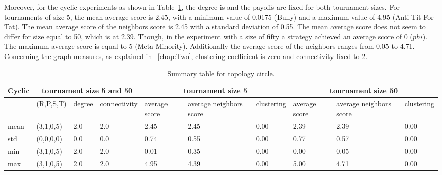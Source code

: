 Moreover, for the cyclic experiments as shown in Table~\ref{sum-cicle}, the degree is
and the payoffs are fixed for both tournament sizes. For tournaments of size 5,
the mean average score is 2.45, with a minimum value of 0.0175 (Bully) and a maximum
value of 4.95 (Anti Tit For Tat). The mean average score of the neighbors score
is 2.45 with a standard deviation of 0.55.
The mean average score does not seem to differ for size equal to 50, which is at
2.39. Though, in the experiment with a size of fifty a strategy
achieved an average score of 0 ($phi$). The maximum average score is equal to
5 (Meta Minority). Additionally the average score of the neighbors ranges
from 0.05 to 4.71. Concerning the graph measures, as explained in ~\ref{chap:Two},
clustering coefficient is zero and connectivity fixed to 2.
\begin{table}[!hbtp]
	\centering
	\begin{adjustbox}{width=1\textwidth}
		\small
		\begin{tabular}{@{}|l|l|l|l|l|l|l|l|l|l|@{}}
			\toprule
			Cyclic & \multicolumn{3}{c|}{tournament size 5 and 50} & \multicolumn{3}{c|}{tournament size 5} & \multicolumn{3}{c|}{tournament size 50}                             \\\midrule

			     & (R,P,S,T) & degree & connectivity & average score & average neighbors score & clustering & average score & average neighbors score & clustering \\\midrule
			mean & (3,1,0,5) & 2.0    & 2.0          & 2.45          & 2.45                    & 0.00       & 2.39          & 2.39                    & 0.00       \\\midrule
			std  & (0,0,0,0) & 0.0    & 0.0          & 0.74          & 0.55                    & 0.00       & 0.77          & 0.57                    & 0.00       \\\midrule
			min  & (3,1,0,5) & 2.0    & 2.0          & 0.01          & 0.35                    & 0.00       & 0.00          & 0.05                    & 0.00       \\\midrule
			max  & (3,1,0,5) & 2.0    & 2.0          & 4.95          & 4.39                    & 0.00       & 5.00          & 4.71                    & 0.00       \\ \bottomrule
		\end{tabular}
	\end{adjustbox}
	\caption{Summary table for topology circle.}
	\label{sum-cicle}
\end{table}

